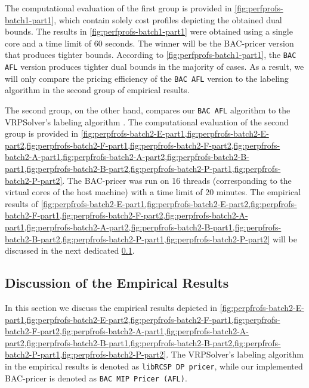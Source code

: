 The computational evaluation of the first group is provided in \cref{fig:perfprofs-batch1-part1},
which contain solely cost profiles depicting the obtained dual bounds.
The results in \cref{fig:perfprofs-batch1-part1} were obtained using a single core and a time limit of 60 seconds.
The winner will be the BAC-pricer version that produces tighter bounds.
According to \cref{fig:perfprofs-batch1-part1}, the \texttt{BAC AFL} version produces tighter dual bounds in the majority of cases.
As a result, we will only compare the pricing efficiency of the \texttt{BAC AFL} version to the labeling algorithm in the second group of empirical results.

\medskip

The second group, on the other hand, compares our \texttt{BAC AFL} algorithm to the VRPSolver's labeling algorithm \parencite{pessoa2020generic}.
The computational evaluation of the second group is provided in
\cref{fig:perpfrofs-batch2-E-part1,fig:perpfrofs-batch2-E-part2,fig:perpfrofs-batch2-F-part1,fig:perpfrofs-batch2-F-part2,fig:perpfrofs-batch2-A-part1,fig:perpfrofs-batch2-A-part2,fig:perpfrofs-batch2-B-part1,fig:perpfrofs-batch2-B-part2,fig:perpfrofs-batch2-P-part1,fig:perpfrofs-batch2-P-part2}.
The BAC-pricer was run on 16 threads (corresponding to the virtual cores of the host machine) with a time limit of 20 minutes.
The empirical results of
\cref{fig:perpfrofs-batch2-E-part1,fig:perpfrofs-batch2-E-part2,fig:perpfrofs-batch2-F-part1,fig:perpfrofs-batch2-F-part2,fig:perpfrofs-batch2-A-part1,fig:perpfrofs-batch2-A-part2,fig:perpfrofs-batch2-B-part1,fig:perpfrofs-batch2-B-part2,fig:perpfrofs-batch2-P-part1,fig:perpfrofs-batch2-P-part2}
will be discussed in the next dedicated \cref{sec:results-discussion}.




\subsection{Discussion of the Empirical Results}
\label{sec:results-discussion}

In this section we discuss the empirical results depicted in
\cref{fig:perpfrofs-batch2-E-part1,fig:perpfrofs-batch2-E-part2,fig:perpfrofs-batch2-F-part1,fig:perpfrofs-batch2-F-part2,fig:perpfrofs-batch2-A-part1,fig:perpfrofs-batch2-A-part2,fig:perpfrofs-batch2-B-part1,fig:perpfrofs-batch2-B-part2,fig:perpfrofs-batch2-P-part1,fig:perpfrofs-batch2-P-part2}.
The VRPSolver's labeling algorithm in the empirical results is denoted as \texttt{libRCSP DP pricer},
while our implemented BAC-pricer is denoted as \texttt{BAC MIP Pricer (AFL)}.

